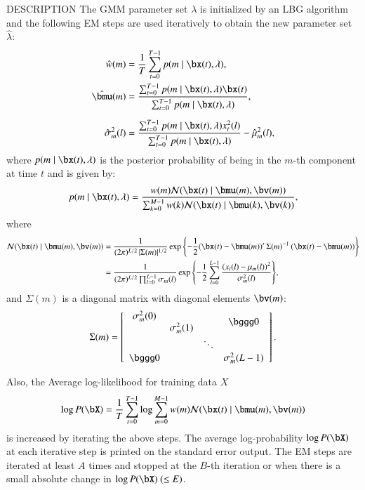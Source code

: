 \begin{qsection}{DESCRIPTION}
The GMM parameter set $\lambda$ is initialized by an LBG algorithm and
the following EM steps are used iteratively to obtain the new parameter set
$\hat{\lambda}$:
\begin{align}
   \hat{w}(m) & = \frac{1}{T}
   \sum_{t=0}^{T-1}p(m\mid\bx(t),\lambda),\notag\\
  \hat{\bmu}(m) & 
 = \frac{\sum_{t=0}^{T-1}p(m\mid\bx(t),\lambda)\bx(t)}
 {\sum_{t=0}^{T-1}p(m\mid\bx(t),\lambda)}, \notag\\[2mm]
  \hat{\sigma}_m^2(l)&
  =\frac{\sum_{t=0}^{T-1}p(m\mid\bx(t),\lambda)x_t^2(l)}
  {\sum_{t=0}^{T-1}p(m\mid\bx(t),\lambda)}
 - \hat{\mu}_m^2(l),\notag
\end{align}
where $p(m\mid\bx(t),\lambda)$ is the posterior probability of being in
the $m$-th component at time $t$ and is given by:
\begin{displaymath}
 p(m\mid\bx(t),\lambda)
 = \frac{w(m){\cal N}(\bx(t)\mid \bmu(m),\bv(m))}
 {\sum_{k=0}^{M-1}w(k){\cal N}(\bx(t)\mid \bmu(k),\bv(k))},
\end{displaymath}
 where
\begin{align}
 {\cal N}(\bx(t)\mid\bmu(m),\bv(m))%
 &=\frac{1}{(2\pi)^{L/2}\,|\Sigma(m)|^{1/2}}%
 \exp{\left\{-\frac{1}{2}%
 (\bx(t)-\bmu(m))'\,\Sigma(m)^{-1}\,%
 (\bx(t)-\bmu(m))\right\}}\notag\\
 &=\frac{1}{(2\pi)^{L/2}\prod_{l=0}^{L-1}\sigma_m(l)}%
 \exp{\left\{-\frac{1}{2}%
 \sum_{l=0}^{L-1}
 \frac{\left(x_t(l)-\mu_m(l)\right)^2}%
 {\sigma_m^2(l)}\right\}},\notag
\end{align}
and $\Sigma(m)$ is a diagonal matrix with diagonal elements
 $\bv(m)$:
\begin{displaymath}
 \Sigma(m)=\left[
 \begin{array}{cccc}
  \sigma_m^2(0) & & &\bigzerou\\
  & \sigma_m^2(1) & &\\
  & & \ddots &\\
  \bigzerol & & & \sigma_m^2(L-1)\\
 \end{array}\right].\notag
\end{displaymath}

Also, the Average log-likelihood for training data $X$
\begin{displaymath}
  \log P(\bX)
 =\frac{1}{T}\sum_{t=0}^{T-1}
 \log\sum_{m=0}^{M-1}w(m){\cal N}(\bx(t)\mid\bmu(m),\bv(m))
\end{displaymath}
is increased by iterating the above steps. The average log-probability $\log
P(\bX)$ at each iterative step is printed on the standard error output.
The EM steps are iterated at least $A$ times and stopped at the $B$-th
iteration or when there is a small absolute change in $\log P(\bX)~(\leq
E)$.

\end{qsection}

